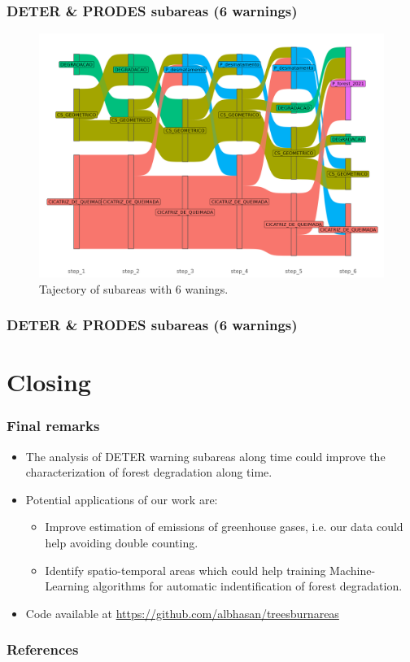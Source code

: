 \documentclass[aspectratio=169]{beamer}
\begin{document}
\begin{frame}
    \frametitle{DETER \& PRODES subareas (6 warnings)}
    \begin{figure}[h] 
        \includegraphics[width=0.65\linewidth]
        {./figures/plot_deter_prodes_subarea_trajectory_6.png}
        \caption{Tajectory of subareas with 6 wanings.}
        \label{fig:deter_prodes_subarea_trajectory_6}
    \end{figure}
\end{frame}
\begin{frame}[allowframebreaks]
    \frametitle{DETER \& PRODES subareas (6 warnings)}
    
\end{frame}





\section{Closing}

\begin{frame}
    \frametitle{Final remarks}
    \begin{itemize}
        \item The analysis of DETER warning subareas along time could improve 
            the characterization of forest degradation along time.
        \item Potential applications of our work are:
            \begin{itemize}
                \item Improve estimation of emissions of greenhouse gases, i.e.
                    our data could help avoiding double counting.
                \item Identify spatio-temporal areas which could help training 
                    Machine-Learning algorithms for automatic indentification 
                    of forest degradation.
            \end{itemize}
        \item Code available at 
            \url{https://github.com/albhasan/treesburnareas}
    \end{itemize}
\end{frame}

\begin{frame}[allowframebreaks]
    \frametitle{References}
    
    
\end{frame}
\end{document}
